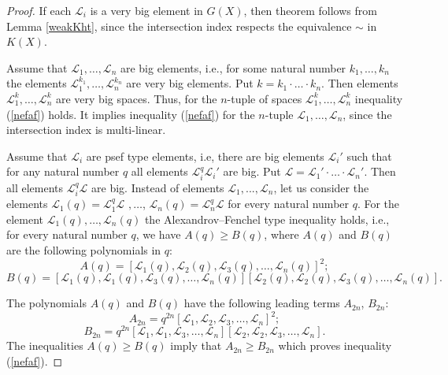 \documentclass[11pt]{article}
\theoremstyle{plain}
\theoremstyle{definition}
\begin{document}
\begin{proof} If each  $\mathcal L_i$ is a very big element in $G(X)$, then theorem follows from Lemma \ref{weakKht}, since the intersection index respects the equivalence $\sim$ in $K(X)$.

Assume that $\mathcal L_1,\dots,\mathcal L_n$ are big elements, i.e., for some natural number $k_1,\dots,k_n$ the elements $\mathcal L_1^{k_1},\dots,\mathcal L_n^{k_n}$ are very big  elements. Put $k=k_1\cdot \ldots \cdot k_n$. Then elements $\mathcal L_1^k,\dots,\mathcal L_n^k$ are very big spaces. Thus, for the $n$-tuple of spaces $\mathcal L_1^k,\dots,\mathcal L_n^k$  inequality (\ref{nefaf}) holds. It implies inequality (\ref{nefaf}) for the $n$-tuple $\mathcal L_1,\dots,\mathcal L_n$, since the intersection index is multi-linear.


Assume that  $\mathcal L_i$ are  psef type elements, i.e, there are  big elements $\mathcal L_i'$ such that for any natural number $q$ all elements $\mathcal L_i^q\mathcal L_i'$ are  big. Put $\mathcal L=\mathcal L_1'\cdot \ldots \cdot \mathcal L_n'$. Then all elements $\mathcal L_i^q\mathcal L$ are  big.
Instead of elements
$\mathcal L_1,...,\mathcal L_n$,
let us consider the elements  $\mathcal L_1(q) =\mathcal L_1^q \mathcal L$ $,\dots$,   $\mathcal L_n(q) =\mathcal L_n^q \mathcal L$
for every  natural number  $q$. For the element $\mathcal L_1(q),\dots, \mathcal L_n(q)$ the Alexandrov--Fenchel type inequality holds, i.e., for every natural number $q$, we  have $A(q)\geq B(q)$, where $A(q)$ and $B(q)$ are the following polynomials in $q$:
\begin{equation*}A(q)=[\mathcal L_1(q),\mathcal L_2(q),\mathcal  L_3(q),\dots,\mathcal  L_n(q)]^2; \end{equation*}  \begin{equation*}B(q)= [\mathcal L_1(q), \mathcal L_1(q), \mathcal  L_3(q), \dots,\mathcal L_n(q)][\mathcal L_2(q), \mathcal L_2(q), \mathcal L_3 (q), \dots, \mathcal  L_n (q)].\end{equation*}


The polynomials $A(q)$ and $B(q)$ have the following  leading terms  $A_{2n}$, $B_{2n}$:  \begin{equation*}A_{2n}=q^{2n}  [\mathcal L_1, \mathcal L_2, \mathcal L_3,\dots, \mathcal L_n]^2;\end{equation*}
\begin{equation*}B_{2n}=q^{2n} [\mathcal L_1,\mathcal L_1, \mathcal  L_3, \dots,\mathcal L_n] [\mathcal L_2,\mathcal L_2, \mathcal  L_3, \dots, \mathcal  L_n].\end{equation*}  The inequalities $A(q)\geq B(q)$  imply that $A_{2n}\geq B_{2n}$ which proves inequality (\ref{nefaf}).
\end{proof}
\end{document}
